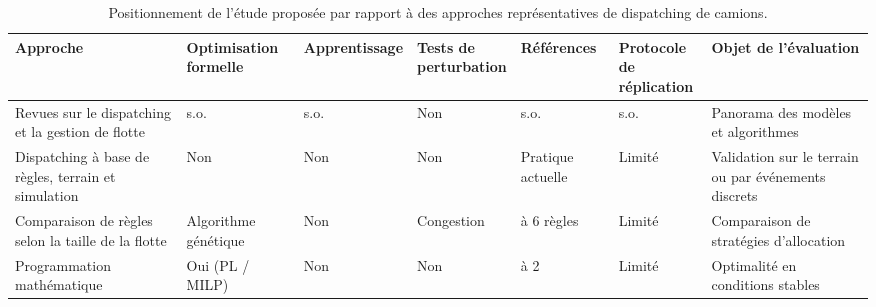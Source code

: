\documentclass[11pt,a4paper]{article}
\renewcommand{\arraystretch}{1.15} %
\begin{document}
\begin{table}[H]
\centering

\caption{Positionnement de l'étude proposée par rapport à des approches représentatives de dispatching de camions.}
\label{tab:litterature}

\renewcommand{\arraystretch}{1.35}
\setlength{\tabcolsep}{3.2pt}
\footnotesize

\begin{tabularx}{\textwidth}{
>{\raggedright\arraybackslash}p{3.0cm}
>{\centering\arraybackslash}p{1.9cm}
>{\centering\arraybackslash}p{2.2cm}
>{\centering\arraybackslash}p{1.7cm}
>{\centering\arraybackslash}p{1.6cm}
>{\centering\arraybackslash}p{2.0cm}
>{\raggedright\arraybackslash}X
}

\toprule

\textbf{Approche} &
\makecell{\textbf{Optimisation}\\\textbf{formelle}} &
\textbf{Apprentissage} &
\makecell{\textbf{Tests de}\\\textbf{perturbation}} &
\textbf{Références} &
\makecell{\textbf{Protocole de}\\\textbf{réplication}} &
\textbf{Objet de l'évaluation} \\

\midrule

Revues sur le dispatching et la gestion de flotte
\cite{AlexandraNewman2010,MohanMunirathinam1994,Alarie2002,Hazrathosseini2024,Afrapoli2017}
&
s.o.
&
s.o.
&
Non
&
s.o.
&
s.o.
&
Panorama des modèles et algorithmes
\\

\addlinespace

Dispatching à base de règles, terrain et simulation
\cite{Subtil2011,MehrnazMohtasham2023,NecmettinCetin2004,MarceloFioroni2008,MiladAbolghasemian2020}
&
Non
&
Non
&
Non
&
Pratique actuelle
&
Limité
&
Validation sur le terrain ou par événements discrets
\\

\addlinespace

Comparaison de règles selon la taille de la flotte
\cite{Zeng2022}
&
Algorithme génétique
&
Non
&
Congestion
&
4 à 6 règles
&
Limité
&
Comparaison de stratégies d'allocation
\\

\addlinespace

Programmation mathématique
\cite{Soumis1989,Ahangaran2012,ChungTa2013,AmandaSmith2020,ZhongxinWang2022}
&
Oui (PL / MILP)
&
Non
&
Non
&
0 à 2
&
Limité
&
Optimalité en conditions stables
\\


\end{tabularx}
\end{table}
\end{document}
